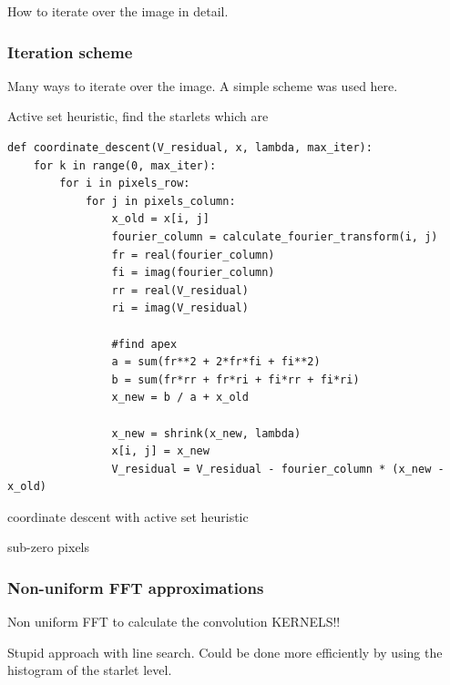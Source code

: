 How to iterate over the image in detail.



\subsubsection{Iteration scheme}
Many ways to iterate over the image. A simple scheme was used here. 

Active set heuristic, find the starlets which are 

\begin{lstlisting} 
def coordinate_descent(V_residual, x, lambda, max_iter):
	for k in range(0, max_iter):
		for i in pixels_row:
			for j in pixels_column:
				x_old = x[i, j]
				fourier_column = calculate_fourier_transform(i, j)
				fr = real(fourier_column)
				fi = imag(fourier_column)
				rr = real(V_residual)
				ri = imag(V_residual)
				
				#find apex
				a = sum(fr**2 + 2*fr*fi + fi**2)
				b = sum(fr*rr + fr*ri + fi*rr + fi*ri)
				x_new = b / a + x_old
				
				x_new = shrink(x_new, lambda)
				x[i, j] = x_new
				V_residual = V_residual - fourier_column * (x_new - x_old)
\end{lstlisting}\label{cd:implementation}

coordinate descent with active set heuristic


sub-zero pixels

\subsubsection{Non-uniform FFT approximations}
Non uniform FFT to calculate the convolution KERNELS!!


Stupid approach with line search. Could be done more efficiently by using the histogram of the starlet level.

